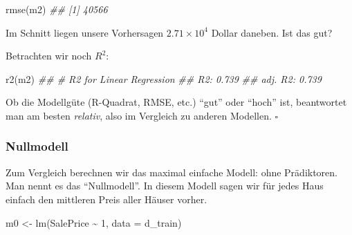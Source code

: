\documentclass[
  a4paper,
]{scrbook}
\newenvironment{Shaded}{\begin{snugshade}}{\end{snugshade}}
\newcommand{\AttributeTok}[1]{\textcolor[rgb]{0.40,0.45,0.13}{#1}}
\newcommand{\DecValTok}[1]{\textcolor[rgb]{0.68,0.00,0.00}{#1}}
\newcommand{\DocumentationTok}[1]{\textcolor[rgb]{0.37,0.37,0.37}{\textit{#1}}}
\newcommand{\FunctionTok}[1]{\textcolor[rgb]{0.28,0.35,0.67}{#1}}
\newcommand{\NormalTok}[1]{\textcolor[rgb]{0.00,0.23,0.31}{#1}}
\newcommand{\OtherTok}[1]{\textcolor[rgb]{0.00,0.23,0.31}{#1}}
\newcommand{\SpecialCharTok}[1]{\textcolor[rgb]{0.37,0.37,0.37}{#1}}
\theoremstyle{definition}
\theoremstyle{definition}
\theoremstyle{definition}
\theoremstyle{remark}
\begin{document}
\begin{Shaded}
\begin{Highlighting}[]
\FunctionTok{rmse}\NormalTok{(m2)}
\DocumentationTok{\#\# [1] 40566}
\end{Highlighting}
\end{Shaded}

Im Schnitt liegen unsere Vorhersagen \ensuremath{2.71\times 10^{4}}
Dollar daneben. Ist das gut?

Betrachten wir noch \(R^2\):

\begin{Shaded}
\begin{Highlighting}[]
\FunctionTok{r2}\NormalTok{(m2)}
\DocumentationTok{\#\# \# R2 for Linear Regression}
\DocumentationTok{\#\#        R2: 0.739}
\DocumentationTok{\#\#   adj. R2: 0.739}
\end{Highlighting}
\end{Shaded}

\begin{tcolorbox}[enhanced jigsaw, colbacktitle=quarto-callout-note-color!10!white, bottomrule=.15mm, left=2mm, breakable, rightrule=.15mm, coltitle=black, title=\textcolor{quarto-callout-note-color}{\faInfo}\hspace{0.5em}{Hinweis}, colback=white, leftrule=.75mm, titlerule=0mm, opacityback=0, bottomtitle=1mm, toprule=.15mm, arc=.35mm, toptitle=1mm, opacitybacktitle=0.6, colframe=quarto-callout-note-color-frame]

Ob die Modellgüte (R-Quadrat, RMSE, etc.) ``gut'' oder ``hoch'' ist,
beantwortet man am besten \emph{relativ}, also im Vergleich zu anderen
Modellen. \(\square\)

\end{tcolorbox}

\subsubsection{Nullmodell}\label{nullmodell}

Zum Vergleich berechnen wir das maximal einfache Modell: ohne
Prädiktoren. Man nennt es das ``Nullmodell''. In diesem Modell sagen wir
für jedes Haus einfach den mittleren Preis aller Häuser vorher.

\begin{Shaded}
\begin{Highlighting}[]
\NormalTok{m0 }\OtherTok{\textless{}{-}} \FunctionTok{lm}\NormalTok{(SalePrice }\SpecialCharTok{\textasciitilde{}} \DecValTok{1}\NormalTok{, }\AttributeTok{data =}\NormalTok{ d\_train)}
\end{Highlighting}
\end{Shaded}
\end{document}
